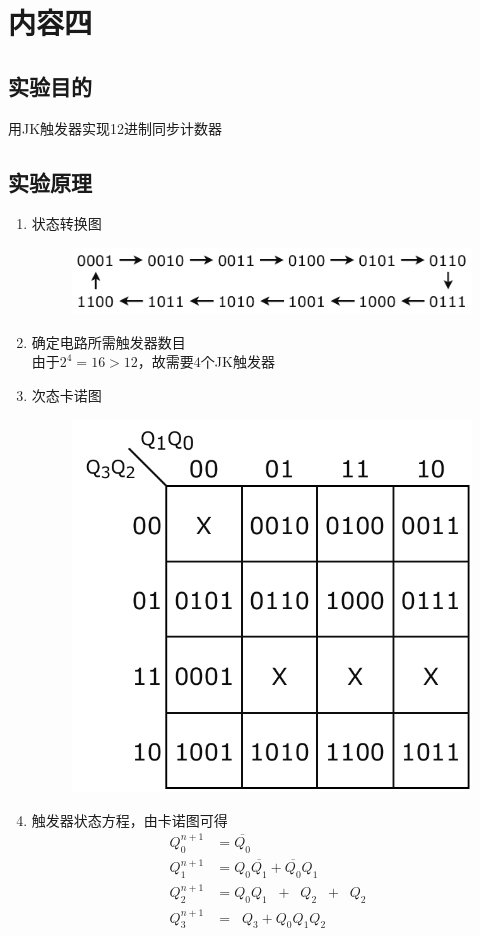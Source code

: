 \documentclass[11pt,UTF8]{ctexart}
\newcommand{\ol}[1]{\mathop{\overline{#1}}}%
\begin{document}
\section{内容四}
\subsection{实验目的}
用JK触发器实现12进制同步计数器

\subsection{实验原理}
\begin{enumerate}
    \item 状态转换图
    \begin{figure}[H]
        \centering
        \includegraphics[width=0.7\linewidth]{fig/12system_state.pdf}
    \end{figure}
    \item 确定电路所需触发器数目\\
    由于$2^4=16>12$，故需要$4$个JK触发器
    \item 次态卡诺图
    \begin{figure}[H]
        \centering
        \includegraphics[width=0.4\linewidth]{fig/Karnaugh_12system.pdf}
    \end{figure}
    \item 触发器状态方程，由卡诺图可得
    \[\begin{aligned}
    Q_0^{n+1}&=\overline{Q_0}\\
    Q_1^{n+1}&=Q_0\overline{Q_1}+\overline{Q_0}Q_1\\
    Q_2^{n+1}&=Q_0Q_1\ol{Q_2}+\ol{Q_1}Q_2\ol{Q_3}+\ol{Q_0}Q_2\ol{Q_3}\\
    Q_3^{n+1}&=\ol{Q_2}Q_3+Q_0Q_1Q_2\ol{Q_3}
    \end{aligned}\]

\end{enumerate}
\end{document}
